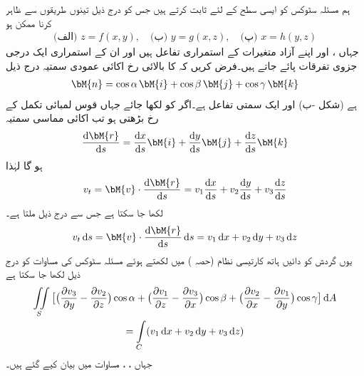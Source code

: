 ہم مسئلہ سٹوکس کو ایسی سطح  کے لئے ثابت کرتے ہیں جس کو درج ذیل تینوں طریقوں سے ظاہر کرنا ممکن ہو
\begin{align}\label{مساوات_خطی_تکمل_سٹوکس_ب}
\text{(الف)}\,\,z=f(x,y),\quad \text{(ب)}\,\,y=g(x,z),\quad \text{(پ)}\,\,x=h(y,z)
\end{align}
جہاں ،  اور  اپنے آزاد متغیرات کے استمراری تفاعل ہیں اور ان کے استمراری ایک درجی جزوی تفرقات پائے جاتے ہیں۔فرض کریں کہ  کا بالائی رخ اکائی عمودی سمتیہ  درج ذیل
\begin{align}\label{مساوات_خطی_تکمل_سٹوکس_پ}
\bM{n}=\cos \alpha \,\bM{i}+\cos \beta \,\bM{j}+\cos \gamma \,\bM{k}
\end{align}
ہے (شکل -ب) اور  ایک سمتی تفاعل ہے۔اگر  کو  لکھا جائے جہاں قوس لمبائی  تکمل کے رخ بڑھتی ہو تب اکائی مماسی سمتیہ
\begin{align*}
\frac{\dif \bM{r}}{\dif s}=\frac{\dif x}{\dif s}\bM{i}+\frac{\dif y}{\dif s}\bM{j}+\frac{\dif z}{\dif s}\bM{k}
\end{align*}
ہو گا لہٰذا
\begin{align*}
v_t=\bM{v}\cdot \frac{\dif \bM{r}}{\dif s}=v_1\frac{\dif x}{\dif s}+v_2\frac{\dif y}{\dif s}+v_3\frac{\dif z}{\dif s}
\end{align*}
لکھا جا سکتا ہے جس سے درج ذیل ملتا ہے۔
\begin{align*}
v_t \dif s=\bM{v}\cdot \frac{\dif \bM{r}}{\dif s}\dif s=v_1\dif x+v_2\dif y+v_3\dif z
\end{align*}
یوں  گردش کو دائیں ہاتھ کارتیسی نظام (حصہ ) میں لکھتے ہوئے مسئلہ سٹوکس کی مساوات کو درج ذیل لکھا جا سکتا ہے
\begin{multline}\label{مساوات_خطی_تکمل_سٹوکس_ت}
\iint\limits_S\big[\big(\frac{\partial v_3}{\partial y}-\frac{\partial v_2}{\partial z}\big)\cos \alpha+\big(\frac{\partial v_1}{\partial z}-\frac{\partial v_3}{\partial x}\big)\cos \beta+\big(\frac{\partial v_2}{\partial x}-\frac{\partial v_1}{\partial y}\big)\cos \gamma\big]\dif A\\
=\int\limits_C (v_1\dif x+v_2\dif y+v_3\dif z)
\end{multline} 
جہاں ، ،  مساوات  میں بیان کیے گئے ہیں۔

